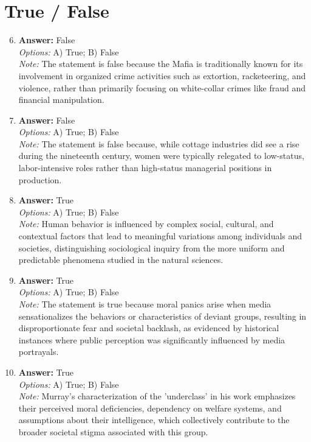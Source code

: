 \documentclass[12pt]{article}
\begin{document}
\section*{True / False}
\begin{enumerate}[label=\arabic*.]
\setcounter{enumi}{5}
\item \textbf{Answer:} False
\\ \textit{Options:} A) True; B) False
\\ \textit{Note:} The statement is false because the Mafia is traditionally known for its involvement in organized crime activities such as extortion, racketeering, and violence, rather than primarily focusing on white-collar crimes like fraud and financial manipulation.
\item \textbf{Answer:} False
\\ \textit{Options:} A) True; B) False
\\ \textit{Note:} The statement is false because, while cottage industries did see a rise during the nineteenth century, women were typically relegated to low-status, labor-intensive roles rather than high-status managerial positions in production.
\item \textbf{Answer:} True
\\ \textit{Options:} A) True; B) False
\\ \textit{Note:} Human behavior is influenced by complex social, cultural, and contextual factors that lead to meaningful variations among individuals and societies, distinguishing sociological inquiry from the more uniform and predictable phenomena studied in the natural sciences.
\item \textbf{Answer:} True
\\ \textit{Options:} A) True; B) False
\\ \textit{Note:} The statement is true because moral panics arise when media sensationalizes the behaviors or characteristics of deviant groups, resulting in disproportionate fear and societal backlash, as evidenced by historical instances where public perception was significantly influenced by media portrayals.
\item \textbf{Answer:} True
\\ \textit{Options:} A) True; B) False
\\ \textit{Note:} Murray's characterization of the 'underclass' in his work emphasizes their perceived moral deficiencies, dependency on welfare systems, and assumptions about their intelligence, which collectively contribute to the broader societal stigma associated with this group.
\end{enumerate}
\end{document}
